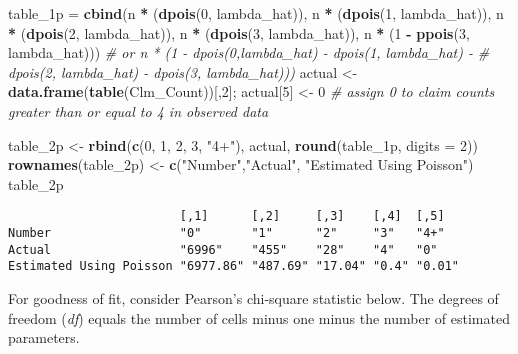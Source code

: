 \documentclass[]{book}
\newenvironment{Shaded}{\begin{snugshade}}{\end{snugshade}}
\newcommand{\KeywordTok}[1]{\textcolor[rgb]{0.13,0.29,0.53}{\textbf{#1}}}
\newcommand{\DataTypeTok}[1]{\textcolor[rgb]{0.13,0.29,0.53}{#1}}
\newcommand{\DecValTok}[1]{\textcolor[rgb]{0.00,0.00,0.81}{#1}}
\newcommand{\StringTok}[1]{\textcolor[rgb]{0.31,0.60,0.02}{#1}}
\newcommand{\CommentTok}[1]{\textcolor[rgb]{0.56,0.35,0.01}{\textit{#1}}}
\newcommand{\OperatorTok}[1]{\textcolor[rgb]{0.81,0.36,0.00}{\textbf{#1}}}
\newcommand{\NormalTok}[1]{#1}
\theoremstyle{definition}
\theoremstyle{definition}
\theoremstyle{definition}
\theoremstyle{remark}
\begin{document}
\begin{Shaded}
\begin{Highlighting}[]
\NormalTok{table_1p =}\StringTok{ }\KeywordTok{cbind}\NormalTok{(n }\OperatorTok{*}\StringTok{ }\NormalTok{(}\KeywordTok{dpois}\NormalTok{(}\DecValTok{0}\NormalTok{, lambda_hat)),}
\NormalTok{                 n }\OperatorTok{*}\StringTok{ }\NormalTok{(}\KeywordTok{dpois}\NormalTok{(}\DecValTok{1}\NormalTok{, lambda_hat)),}
\NormalTok{                 n }\OperatorTok{*}\StringTok{ }\NormalTok{(}\KeywordTok{dpois}\NormalTok{(}\DecValTok{2}\NormalTok{, lambda_hat)),}
\NormalTok{                 n }\OperatorTok{*}\StringTok{ }\NormalTok{(}\KeywordTok{dpois}\NormalTok{(}\DecValTok{3}\NormalTok{, lambda_hat)),}
\NormalTok{                 n }\OperatorTok{*}\StringTok{ }\NormalTok{(}\DecValTok{1} \OperatorTok{-}\StringTok{ }\KeywordTok{ppois}\NormalTok{(}\DecValTok{3}\NormalTok{, lambda_hat)))  }
\CommentTok{# or n * (1 - dpois(0,lambda_hat) - dpois(1, lambda_hat) -}
\CommentTok{# dpois(2, lambda_hat) - dpois(3, lambda_hat)))}
\NormalTok{actual <-}\StringTok{ }\KeywordTok{data.frame}\NormalTok{(}\KeywordTok{table}\NormalTok{(Clm_Count))[,}\DecValTok{2}\NormalTok{];}
\NormalTok{actual[}\DecValTok{5}\NormalTok{] <-}\StringTok{ }\DecValTok{0}  \CommentTok{# assign 0 to claim counts greater than or equal to 4 in observed data}

\NormalTok{table_2p <-}\StringTok{ }\KeywordTok{rbind}\NormalTok{(}\KeywordTok{c}\NormalTok{(}\DecValTok{0}\NormalTok{, }\DecValTok{1}\NormalTok{, }\DecValTok{2}\NormalTok{, }\DecValTok{3}\NormalTok{, }\StringTok{"4+"}\NormalTok{), actual, }\KeywordTok{round}\NormalTok{(table_1p, }\DataTypeTok{digits =} \DecValTok{2}\NormalTok{))}
\KeywordTok{rownames}\NormalTok{(table_2p) <-}\StringTok{ }\KeywordTok{c}\NormalTok{(}\StringTok{"Number"}\NormalTok{,}\StringTok{"Actual"}\NormalTok{, }\StringTok{"Estimated Using Poisson"}\NormalTok{)}
\NormalTok{table_2p}
\end{Highlighting}
\end{Shaded}

\begin{verbatim}
                        [,1]      [,2]     [,3]    [,4]  [,5]  
Number                  "0"       "1"      "2"     "3"   "4+"  
Actual                  "6996"    "455"    "28"    "4"   "0"   
Estimated Using Poisson "6977.86" "487.69" "17.04" "0.4" "0.01"
\end{verbatim}

For goodness of fit, consider Pearson's chi-square statistic below. The
degrees of freedom (\emph{df}) equals the number of cells minus one
minus the number of estimated parameters.
\end{document}
